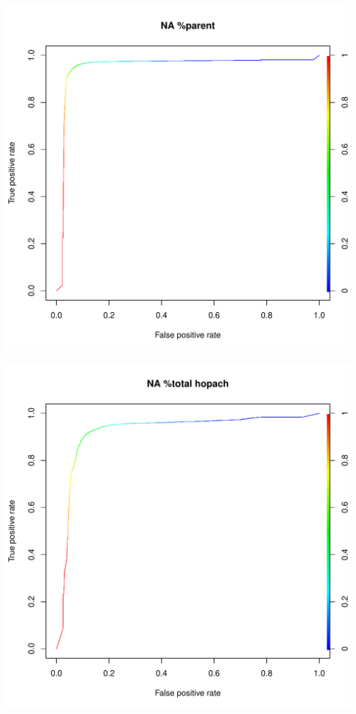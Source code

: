 \documentclass[11pt,a4paper,twoside]{report}\usepackage[]{graphicx}\usepackage[]{color}
\makeatletter
\def\maxwidth{ %
  \ifdim\Gin@nat@width>\linewidth
    \linewidth
  \else
    \Gin@nat@width
  \fi
}
\newenvironment{knitrout}{}{} %
\makeatother
\begin{document}
\begin{knitrout}
\includegraphics[width=\maxwidth]{figure/fig_code-33} 

\includegraphics[width=\maxwidth]{figure/fig_code-34} 


\end{knitrout}
\end{document}
